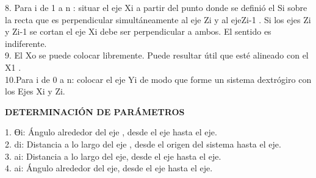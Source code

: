 \documentclass[12pt,letterpaper]{report}
\begin{document}
\begin{flushleft}
\begin{flushleft}
\begin{flushleft}
8. Para i de 1 a n : situar el eje Xi a partir del punto donde se definió el {Si} sobre la
recta que es perpendicular simultáneamente al eje Zi y al ejeZi-1 . Si los ejes  Zi y Zi-1
 se cortan el eje Xi debe ser perpendicular a ambos. El sentido es indiferente.\\
 
9. El Xo se puede colocar libremente. Puede resultar útil que esté alineado con el X1 .\\

10.Para i de 0 a n: colocar el eje Yi de modo que forme un sistema dextrógiro con los
Ejes Xi y Zi.
\begin{flushleft}
\textbf{DETERMINACIÓN DE PARÁMETROS}
\begin{flushleft}
1. Ɵi: Ángulo alrededor del eje , desde el eje hasta el eje.\\

2. di: Distancia a lo largo del eje , desde el origen del sistema hasta el eje.\\

3. ai: Distancia a lo largo del eje, desde el eje hasta el eje.\\

4. ai: Ángulo alrededor del eje, desde el eje hasta el eje.

\end{flushleft}
\end{flushleft}

\end{flushleft}
\end{flushleft}
\end{flushleft}
\end{document}
